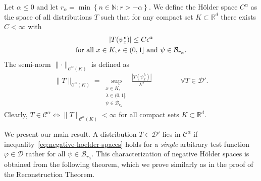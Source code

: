 \begin{definition}
  Let \( \alpha \leq 0 \) and let \( r_\alpha = \min\left\{ n \in \mathbb{N} : r > -\alpha \right\} \). We define the Hölder space \( C^\alpha \) as the space of all distributions \( T \) such that for any compact set \( K \subset \mathbb{R}^d \) there exists \( C < \infty \) with 
  \begin{gather}
    |T(\psi^\epsilon_x)| \leq C \epsilon^\alpha \label{eq:negative-hoelder-spaces} \\
    \text{for all \(x \in K,  \epsilon \in (0,1] \) and \( \psi \in \mathcal{B}_{r_\alpha} \)}. \nonumber 
  \end{gather}
  The semi-norm \( \lVert \cdot \rVert_{\mathcal{C}^\alpha(K)} \) is defined as 
  \begin{align}\label{tennisarm}
    \lVert T \rVert_{\mathcal{C}^\alpha(K)} 
    = \sup_{
      \substack{
        x \in K,\\
        \lambda \in (0,1],\\
        \psi \in \mathcal{B}_{r_\alpha}
      }
    } \frac{|T(\psi^\lambda_x)|}{\lambda^\alpha} \hspace{4em} \forall T \in \mathcal{D}'.
  \end{align}
  Clearly, \( T \in \mathcal{C}^\alpha \iff \lVert T \rVert_{\mathcal{C}^\alpha(K)} < \infty \) for all compact sets \( K \subset \mathbb{R}^d \).
\end{definition}

We present our main result. A distribution \( T \in \mathcal{D}' \) lies in \( \mathcal{C}^\alpha \) if inequality~\eqref{eq:negative-hoelder-spaces} holds for a \emph{single} arbitrary test function \( \varphi \in \mathcal{D} \) rather for all \( \psi \in \mathcal{B}_{r_\alpha} \). This characterization of negative Hölder spaces is obtained from the following theorem, which we prove similarly as in the proof of the Reconstruction Theorem.

